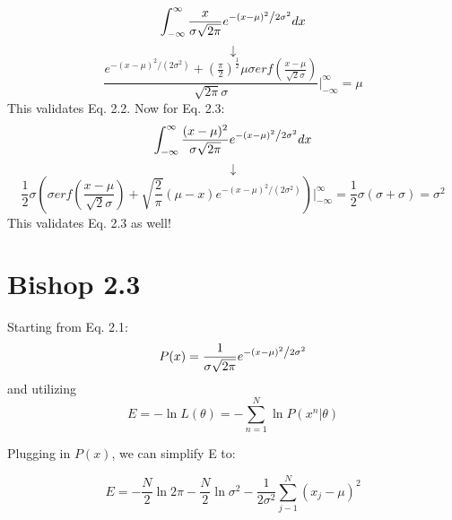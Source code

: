 \documentclass[12pt, letterpaper]{article}
\begin{document}
\begin{equation}
\int_{-\infty}^{\infty}  \frac{x}{{\sigma \sqrt {2\pi } }}e^{{{ - \left( {x - \mu } \right)^2 } \mathord{\left/ {\vphantom {{ - \left( {x - \mu } \right)^2 } {2\sigma ^2 }}} \right. \kern-\nulldelimiterspace} {2\sigma ^2 }}} dx
\end{equation}
\begin{equation}
\downarrow
\end{equation}
\begin{equation}
\frac{e^{-(x - \mu )^2/(2 \sigma^2)} + (\frac{\pi}{2})^{\frac{1}{2}} \mu \sigma erf(\frac{x - \mu}{\sqrt{2}\sigma})}{\sqrt{2 \pi} \sigma}\rvert_{-\infty}^{\infty} = \mu
\end{equation}
This validates Eq. 2.2. Now for Eq. 2.3:
\begin{equation}
\int_{-\infty}^{\infty}  \frac{(x - \mu)^2}{{\sigma \sqrt {2\pi } }}e^{{{ - \left( {x - \mu } \right)^2 } \mathord{\left/ {\vphantom {{ - \left( {x - \mu } \right)^2 } {2\sigma ^2 }}} \right. \kern-\nulldelimiterspace} {2\sigma ^2 }}} dx
\end{equation}
\begin{equation}
\downarrow
\end{equation}
\begin{equation}
\frac{1}{2} \sigma (\sigma  erf(\frac{x - \mu}{\sqrt{2}\sigma}) + \sqrt{\frac{2}{\pi}} (\mu - x) e^{-(x - \mu )^2/(2 \sigma^2)}) \rvert_{-\infty}^{\infty} = \frac{1}{2} \sigma (\sigma + \sigma) = \sigma^2
\end{equation}
This validates Eq. 2.3 as well!

\section*{Bishop 2.3}
Starting from Eq. 2.1:
\begin{equation}
P(x) = \frac{1}{{\sigma \sqrt {2\pi } }}e^{{{ - \left( {x - \mu } \right)^2 } \mathord{\left/ {\vphantom {{ - \left( {x - \mu } \right)^2 } {2\sigma ^2 }}} \right. \kern-\nulldelimiterspace} {2\sigma ^2 }}}
\end{equation}
and utilizing
\begin{equation}
E = - \ln L(\theta) = - \sum_{n=1}^{N} \ln P(x^n | \theta)
\end{equation}

Plugging in $P(x)$, we can simplify E to:

\begin{equation}
E = -\frac{N}{2} \ln 2 \pi - \frac{N}{2} \ln \sigma^2 - \frac{1}{2 \sigma^2} \sum_{j-1}^N (x_j - \mu)^2
\end{equation}
\end{document}
